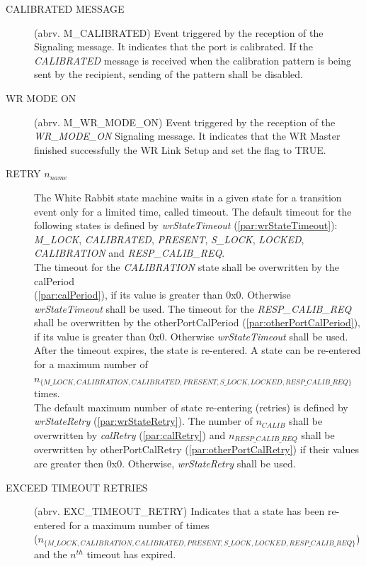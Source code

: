 \documentclass[a4paper, 12pt]{article}
\begin{document}
\begin{description}
\item[CALIBRATED MESSAGE] 		(abrv. M\_CALIBRATED)		Event triggered by the 
      reception of the   Signaling message. It indicates that the port is 
      calibrated. If the \textit{CALIBRATED} message is received when the calibration pattern is 
      being sent by the recipient, sending of the pattern shall be disabled. 

\item[WR MODE ON] 			(abrv. M\_WR\_MODE\_ON)		Event triggered by the 
      reception of the \textit{WR\_MODE\_ON} Signaling message. It indicates that the WR Master 
      finished successfully the WR Link Setup and set the  flag to TRUE. 

\item[RETRY $n_{name}$]	The White Rabbit state
      machine waits in a given state for a transition event only for a limited time, called timeout.
      The default timeout for the following states is defined by \textit{wrStateTimeout} 
      (\ref{par:wrStateTimeout}): \textit{M\_LOCK}, \textit{CALIBRATED}, \textit{PRESENT}, 
      \textit{S\_LOCK}, \textit{LOCKED}, \textit{CALIBRATION} and \textit{RESP\_CALIB\_REQ}.\\
      The timeout for the  \textit{CALIBRATION} state shall be overwritten by the 
      calPeriod \\ (\ref{par:calPeriod}), if its value is greater than 0x0. Otherwise 
      \textit{wrStateTimeout} shall be used.
      The timeout for the \textit{RESP\_CALIB\_REQ} shall be overwritten by the otherPortCalPeriod 
      (\ref{par:otherPortCalPeriod}), if its value is greater than 0x0. Otherwise 
      \textit{wrStateTimeout} shall be used.\\
      After the timeout expires, the state is re-entered. A state can be re-entered for a maximum 
      number of   
      $n_{\{M\_LOCK, CALIBRATION, CALIBRATED, PRESENT, S\_LOCK, LOCKED, RESP\_CALIB\_REQ\}}$ times.\\
      The default maximum number of state re-entering (retries) is defined by \textit{wrStateRetry} 
      (\ref{par:wrStateRetry}). The number of $n_{CALIB}$ shall be overwritten by \textit{calRetry} 
      (\ref{par:calRetry}) and $n_{RESP\_CALIB\_REQ}$ shall be overwritten by otherPortCalRetry 
      (\ref{par:otherPortCalRetry}) if their values are greater then 0x0. Otherwise, 
      \textit{wrStateRetry} shall be used.

\item[EXCEED TIMEOUT RETRIES] 		(abrv. EXC\_TIMEOUT\_RETRY)	Indicates that a state 
      has been re-entered for a maximum number of times \\
      ($n_{\{M\_LOCK, CALIBRATION, CALIBRATED, PRESENT, S\_LOCK, LOCKED, RESP\_CALIB\_REQ\}}$) and 
      the $n^{th}$ timeout has expired.
									  
\end{description}
\end{document}
